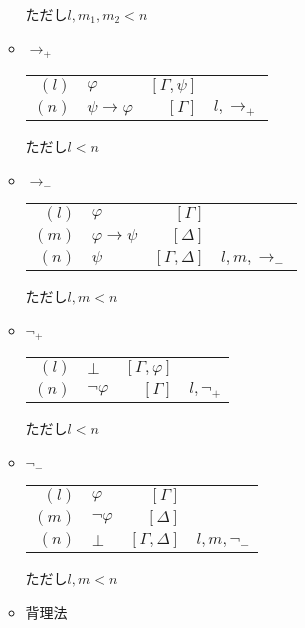 \documentclass[10pt,b5paper,papersize,dvipdfmx]{jsbook}
\begin{document}
\begin{itemize}
\begin{itemize}
\begin{table}[H]
\begin{center}
\begin{tabular}{rlrl}
\end{tabular}
\end{center}
\end{table}
ただし$l,m_1,m_2<n$
\item $\to_+$
\begin{table}[H]
\begin{center}
\begin{tabular}{rlrl}
$(l)$&$\varphi$&$[\Gamma,\psi]$& \\
$(n)$&$\psi \to \varphi$&$[\Gamma]$&$l,\to_+$ \\
\end{tabular}
\end{center}
\end{table}
ただし$l<n$
\item $\to_-$
\begin{table}[H]
\begin{center}
\begin{tabular}{rlrl}
$(l)$&$\varphi$&$[\Gamma]$& \\
$(m)$&$\varphi \to \psi$&$[\Delta]$& \\
$(n)$&$\psi$&$[\Gamma,\Delta]$&$l,m,\to_-$
\end{tabular}
\end{center}
\end{table}
ただし$l,m<n$
\item $\lnot_+$
\begin{table}[H]
\begin{center}
\begin{tabular}{rlrl}
$(l)$&$\bot$&$[\Gamma,\varphi]$& \\
$(n)$&$\lnot \varphi$&$[\Gamma]$&$l,\lnot_+$
\end{tabular}
\end{center}
\end{table}
ただし$l<n$
\item $\lnot_-$
\begin{table}[H]
\begin{center}
\begin{tabular}{rlrl}
$(l)$&$\varphi$&$[\Gamma]$& \\
$(m)$&$\lnot \varphi$&$[\Delta]$& \\
$(n)$&$\bot$&$[\Gamma,\Delta]$&$l,m,\lnot_-$
\end{tabular}
\end{center}
\end{table}
ただし$l,m<n$
\item 背理法
\begin{table}[H]
\begin{center}

\end{center}
\end{table}
\end{itemize}
\end{itemize}
\end{document}
